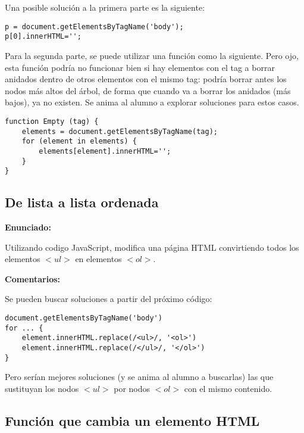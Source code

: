 Una posible solución a la primera parte es la siguiente:

\begin{verbatim}
p = document.getElementsByTagName('body');
p[0].innerHTML='';
\end{verbatim}

Para la segunda parte, se puede utilizar una función como la siguiente. Pero ojo, esta función podría no funcionar bien si hay elementos con el tag a borrar anidados dentro de otros elementos con el mismo tag: podría borrar antes los nodos más altos del árbol, de forma que cuando va a borrar los anidados (más bajos), ya no existen. Se anima al alumno a explorar soluciones para estos casos.

\begin{verbatim}
function Empty (tag) {
    elements = document.getElementsByTagName(tag);
    for (element in elements) {
        elements[element].innerHTML='';
    }
}
\end{verbatim}


\subsection{De lista a lista ordenada}
\label{subsec:eje-js-lista-ordenada}

\textbf{Enunciado:}

Utilizando codigo JavaScript, modifica una página HTML convirtiendo todos los elementos $<ul>$ en elementos $<ol>$.

\textbf{Comentarios:}

Se pueden buscar soluciones a partir del próximo código:

\begin{verbatim}
document.getElementsByTagName('body')
for ... {
    element.innerHTML.replace(/<ul>/, '<ol>')
    element.innerHTML.replace(/</ul>/, '</ol>')
}
\end{verbatim}

Pero serían mejores soluciones (y se anima al alumno a buscarlas) las que sustituyan los nodos $<ul>$ por nodos $<ol>$ con el mismo contenido.

\subsection{Función que cambia un elemento HTML}
\label{subsec:eje-js-cambia-elemento}

